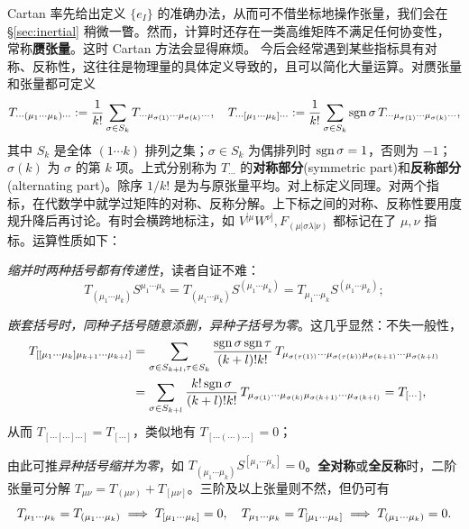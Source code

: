 Cartan 率先给出定义 $\{e_I\}$ 的准确办法，从而可不借坐标地操作张量，我们会在 \S\ref{sec:inertial} 稍微一瞥。然而，计算时还存在一类高维矩阵不满足任何协变性，常称\textbf{赝张量}。这时 Cartan 方法会显得麻烦。
今后会经常遇到某些指标具有对称、反称性，这往往是物理量的具体定义导致的，且可以简化大量运算。对赝张量和张量都可定义
\[
    T_{\cdots(\mu_1\cdots\mu_k)\cdots}:=\frac{1}{k!}\sum_{\sigma\in S_k} T_{\cdots\mu_{\sigma(1)}\cdots\mu_{\sigma(k)}\cdots},\quad
    T_{\cdots[\mu_1\cdots\mu_k]\cdots}:=\frac{1}{k!}\sum_{\sigma\in S_k} \operatorname{sgn}\sigma\,T_{\cdots\mu_{\sigma(1)}\cdots\mu_{\sigma(k)}\cdots},
\]
其中 $S_k$ 是全体 $(1\cdots k)$ 排列之集；$\sigma\in S_k$ 为偶排列时 $\operatorname{sgn}\sigma=1$，否则为 $-1$；$\sigma(k)$ 为 $\sigma$ 的第 $k$ 项。上式分别称为 $T_{\cdots}$ 的\textbf{对称部分}(symmetric part)和\textbf{反称部分}(alternating part)。除序 $1/k!$ 是为与原张量平均。对上标定义同理。对两个指标，在代数学中就学过矩阵的对称、反称分解。上下标之间的对称、反称性要用度规升降后再讨论。有时会横跨地标注，如 $V^{[\mu}W^{\nu]},F_{(\mu|\sigma\lambda|\nu)}$ 都标记在了 $\mu,\nu$ 指标。运算性质如下：
\begin{compactenum}
    \item \emph{缩并时两种括号都有传递性}，读者自证不难：
    \[T_{(\mu_1\cdots\mu_k)}S^{\mu_1\cdots\mu_k}=T_{(\mu_1\cdots\mu_k)}S^{(\mu_1\cdots\mu_k)}=T_{\mu_1\cdots\mu_k}S^{(\mu_1\cdots\mu_k)};\]
    \item \emph{嵌套括号时，同种子括号随意添删，异种子括号为零}。这几乎显然：不失一般性，
    \begin{align*}
        T_{[[\mu_1\cdots\mu_k]\mu_{k+1}\cdots\mu_{k+l}]}&=\sum_{\sigma\in S_{k+l},\tau\in S_k}\frac{\operatorname{sgn}\sigma\operatorname{sgn}\tau}{(k+l)!k!}\,T_{\mu_{\sigma(\tau(1))}\cdots\mu_{\sigma(\tau(k))}\mu_{\sigma(k+1)}\cdots\mu_{\sigma(k+l)}}\\
        &=\sum_{\sigma\in S_{k+l}}\frac{k!\operatorname{sgn}\sigma}{(k+l)!k!}\,T_{\mu_{\sigma(1)}\cdots\mu_{\sigma(k)}\mu_{\sigma(k+1)}\cdots\mu_{\sigma(k+l)}}=T_{[\cdots]},
    \end{align*}
    从而 $T_{[\cdots[\cdots]\cdots]}=T_{[\cdots]}$，类似地有 $T_{[\cdots(\cdots)\cdots]}=0$；
    \item 由此可推\emph{异种括号缩并为零}，如 $T_{(\mu_1\cdots\mu_k)}S^{[\mu_1\cdots\mu_k]}=0$。\textbf{全对称}或\textbf{全反称}时，二阶张量可分解 $T_{\mu\nu}=T_{(\mu\nu)}+T_{[\mu\nu]}$。三阶及以上张量则不然，但仍可有
    \[T_{\mu_1\cdots\mu_k}=T_{(\mu_1\cdots\mu_k)}\implies T_{[\mu_1\cdots\mu_k]}=0,\quad
        T_{\mu_1\cdots\mu_k}=T_{[\mu_1\cdots\mu_k]}\implies T_{(\mu_1\cdots\mu_k)}=0.\]
\end{compactenum}



